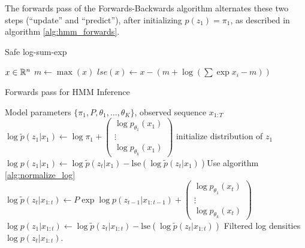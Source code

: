 \documentclass{article}
\begin{document}
The forwards pass of the Forwards-Backwards algorithm alternates these two steps
(``update'' and ``predict''), after initializing $p\left(z_{1}\right) =
\pi_{1}$, as described in algorithm \ref{alg:hmm_forwards}.

\begin{algorithm}
   \caption{Safe log-sum-exp}
   \label{alg:normalize_log}
   \begin{algorithmic}
      $x \in \mathbb{R}^{n}$
     \STATE $m \leftarrow \max\left(x\right)$
      $lse\left(x\right) \leftarrow x - \left(m + \log\left(\sum\exp{x_{i} - m}\right)\right)$
   \end{algorithmic}
\end{algorithm}

\begin{algorithm}
   \caption{Forwards pass for HMM Inference}
   \label{alg:hmm_forwards}
\begin{algorithmic}
   Model parameters $\{\pi_{1}, P, \theta_1, \dots, \theta_K\}$,
  observed sequence $x_{1:T}$
  \STATE $\log \tilde{p}\left(z_{1}\vert x_{1}\right) \leftarrow
  \log\pi_{1} + \begin{pmatrix} \log p_{\theta_{1}}\left(x_{1}\right) \\ \vdots \\ \log p_{\theta_{k}}\left(x_{1}\right) \end{pmatrix}$ \hfill initialize distribution of $z_{1}$
  \STATE $\log p\left(z_{1} \vert x_{1}\right) \leftarrow \log \tilde{p}\left(z_{t} \vert x_{1}\right) - \text{lse}\left(\log \tilde{p}\left(z_{t} \vert x_{1}\right)\right)$\hfill Use algorithm \ref{alg:normalize_log}
  \STATE $\log \tilde{p}\left(z_{t} \vert x_{1:t}\right) \leftarrow P \exp{\log p\left(z_{t - 1} \vert x_{1:t - 1}\right)} + \begin{pmatrix}  \log p_{\theta_{1}}\left(x_{t}\right) \\ \vdots \\ \log p_{\theta_{k}}\left(x_{t}\right) \end{pmatrix}$
  \STATE $\log p\left(z_{1} \vert x_{1:t}\right) \leftarrow \log \tilde{p}\left(z_{t} \vert x_{1:t}\right) - \text{lse}\left(\log \tilde{p}\left(z_{t} \vert x_{1:t}\right)\right)$\hfill
  \ENDFOR
   Filtered log densities $\log p\left(z_{t} \vert x_{1:t}\right)$.
\end{algorithmic}
\end{algorithm}
\end{document}
